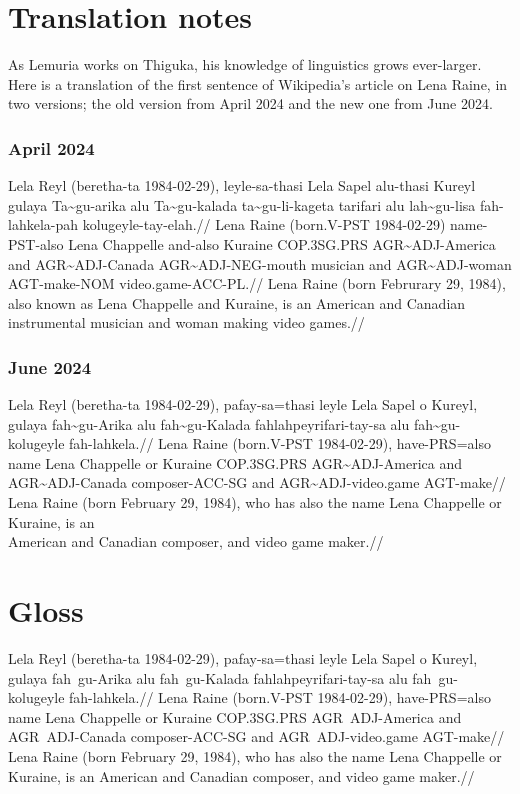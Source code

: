 \section{Translation notes}
As Lemuria works on Thiguka, his knowledge of linguistics grows ever-larger.
Here is a translation of the first sentence of Wikipedia's article on Lena Raine, in two versions; the old version from April 2024 and the new one from June 2024.

\subsubsection*{April 2024}

\ex
\begingl
\gla Lela Reyl   (beretha-ta 1984-02-29),   leyle-sa-thasi Lela Sapel      alu-thasi Kureyl gulaya       Ta\~{}gu-arika     alu Ta\~{}gu-kalada   ta\~{}gu-li-kageta   tarifari alu lah\~{}gu-lisa   fah-lahkela-pah kolugeyle-tay-elah.//
\glb Lena Raine  (born.V-PST 1984-02-29)    name-PST-also  Lena Chappelle  and-also  Kuraine COP.3SG.PRS AGR\~{}ADJ-America and AGR\~{}ADJ-Canada AGR\~{}ADJ-NEG-mouth musician and AGR\~{}ADJ-woman AGT-make-NOM    video.game-ACC-PL.//
\glft Lena Raine  (born Februrary 29, 1984), also known as Lena Chappelle and Kuraine, is an American and Canadian instrumental musician and woman making video games.//
\endgl
\xe

\newpage

\subsubsection*{June 2024}

\ex
\begingl
\gla Lela Reyl  (beretha-ta 1984-02-29), pafay-sa=thasi leyle Lela Sapel     o  Kureyl, gulaya      fah\~{}gu-Arika    alu fah\~{}gu-Kalada  fahlahpeyrifari-tay-sa alu fah\~{}gu-kolugeyle   fah-lahkela.//
\glb Lena Raine (born.V-PST 1984-02-29), have-PRS=also  name  Lena Chappelle or Kuraine COP.3SG.PRS AGR\~{}ADJ-America and AGR\~{}ADJ-Canada composer-ACC-SG        and AGR\~{}ADJ-video.game AGT-make//
\glft Lena Raine (born February 29, 1984), who has also the name Lena Chappelle or Kuraine, is an \\American and Canadian composer, and video game maker.//
\endgl
\xe

\section{Gloss}

\ex
\begingl
\gla  Lela Reyl (beretha-ta 1984-02-29), pafay-sa=thasi leyle Lela Sapel o Kureyl, gulaya fah~gu-Arika alu fah~gu-Kalada fahlahpeyrifari-tay-sa alu fah~gu-kolugeyle fah-lahkela.//
\glb  Lena Raine (born.V-PST 1984-02-29), have-PRS=also name Lena Chappelle or Kuraine COP.3SG.PRS AGR~ADJ-America and AGR~ADJ-Canada composer-ACC-SG and AGR~ADJ-video.game AGT-make//
\glft Lena Raine (born February 29, 1984), who has also the name Lena Chappelle or Kuraine, is an American and Canadian composer, and video game maker.//
\endgl 
\xe

